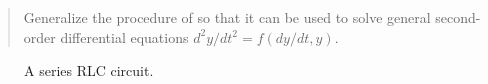 \begin{quote}
 Generalize the 
procedure of  so that it can be used to solve general
second-order differential equations \( d^2\!y / dt^2 =
f(dy / dt, y) \).
\end{quote}

\begin{figure}[tb]
\label{Figure 3.36}
\centering
\begin{comment}
\heading{Figure 3.36:} A series RLC circuit.

\begin{example}
              + v_R -
        i_R
     +--->----'\/\/\,--------+
     |                       |  i_L
    \|/          R          \|/
  +  |  i_C                  |_   +
    -+-                       _)
v_C -+- C                     _)  v_L
     |                        _)
  -  |                       |    -
     +-----------------------+
\end{example}
\end{comment}

\par\bigskip
\noindent
{} A series RLC circuit.
\end{figure}

